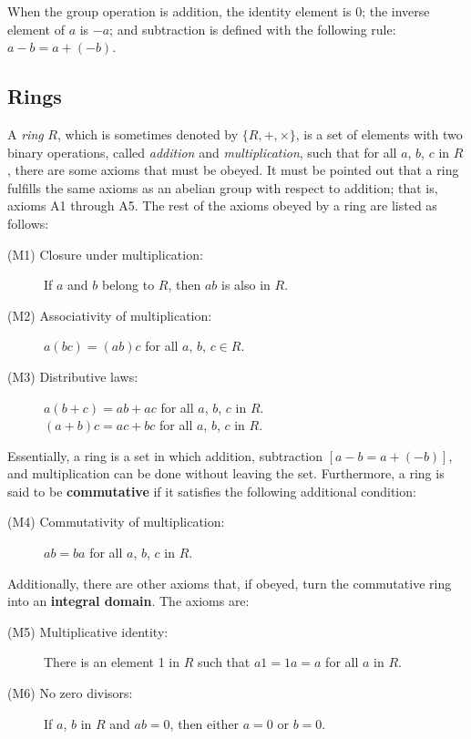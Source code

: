 When the group operation is addition, the identity element is 0; the inverse element of $a$ is $-a$; and subtraction is defined with the following rule: $a-b = a+(-b)$. 
  
\subsection{Rings}

A \emph{ring} $R$, which is sometimes denoted by $\{R, +, \times \}$, is a set of elements with two binary operations, called \textit{addition} and \textit{multiplication}, such that for all $a$, $b$, $c$ in $R$, there are some axioms that must be obeyed. It must be pointed out that a ring fulfills the same axioms as an abelian group with respect to addition; that is, axioms A1 through A5. The rest of the axioms obeyed by a ring are listed as follows:
\begin{description}
\item[(M1) Closure under multiplication:] If $a$ and $b$ belong to $R$, then $ab$ is also in $R$.
\item[(M2) Associativity of multiplication:] $a(bc) = (ab)c$ for all $a$, $b$, $c \in R$.
\item[(M3) Distributive laws:] $a(b+c) = ab+ ac$ for all $a$, $b$, $c$ in $R$. \\ $(a+b)c = ac + bc$ for all $a$, $b$, $c$ in $R$.
\end{description}

Essentially, a ring is a set in which addition, subtraction $[a-b = a + (-b)]$, and multiplication can be done without leaving the set. Furthermore, a ring is said to be \textbf{commutative} if it satisfies the following additional condition:
\begin{description}
\item[(M4) Commutativity of multiplication:] $ab = ba$ for all $a$, $b$, $c$ in $R$.
\end{description}

Additionally, there are other axioms that, if obeyed, turn the commutative ring into an \textbf{integral domain}. The axioms are:  

\begin{description}
\item[(M5) Multiplicative identity:] There is an element 1 in $R$ such that $a1 = 1a = a$ for all $a$ in $R$.
\item[(M6) No zero divisors:] If $a$, $b$ in $R$ and $ab=0$, then either $a=0$ or $b=0$.
\end{description}

